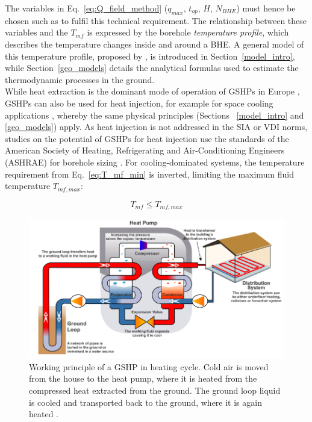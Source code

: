 The variables in Eq.~\ref{eq:Q_field_method} ($q_\mathit{max}$, $t_{op}$, $H$, $N_\mathit{BHE}$) must hence be chosen such as to fulfil this technical requirement.
%
The relationship between these variables and the $T_{mf}$ is expressed by the borehole \textit{temperature profile}, which describes the temperature changes inside and around a BHE.
A general model of this temperature profile, proposed by \citet{claesson_conductive_1988}, is introduced in Section~\ref{model_intro}, while Section~\ref{geo_models} details the analytical formulas used to estimate the thermodynamic processes in the ground.
\\

While heat extraction is the dominant mode of operation of GSHPs in Europe \cite{lund_direct_2020}, GSHPs can also be used for heat injection, for example for space cooling applications \cite{kavanaugh_geothermal_2014}, whereby the same physical principles (Sections ~\ref{model_intro} and \ref{geo_models}) apply.
As heat injection is not addressed in the SIA or VDI norms, studies on the potential of GSHPs for heat injection use the standards of the American Society of Heating, Refrigerating and Air-Conditioning Engineers (ASHRAE) \cite{kavanaugh_geothermal_2014} for borehole sizing \cite{aditya_environmental_2020,miglani_methodology_2018,michopoulos_potential_2011} . For cooling-dominated systems, the temperature requirement from Eq.~\ref{eq:T_mf_min} is inverted, limiting the maximum fluid temperature $T_\mathit{mf,max}$:

\begin{equation}
\label{eq:T_mf_max}
T_{mf} \leq T_\mathit{mf,max}
\end{equation}

\begin{figure}[bt]
    \centering
    \includegraphics[width=0.7\linewidth]{images/Figs/GSHP.png}
    \caption{Working principle of a GSHP in heating cycle. Cold air is moved from the house to the heat pump, where it is heated from the compressed heat extracted from the ground. The ground loop liquid is cooled and transported back to the ground, where it is again heated \cite{gns_science_nz_geothermal_2016}.}
    \label{fig:HP}
\end{figure}

